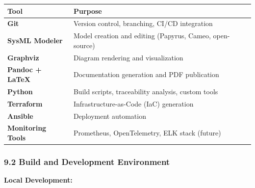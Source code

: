 \documentclass[12pt]{article}
\begin{document}
{\def\LTcaptype{none} %
\begin{longtable}[]{@{}
  >{\raggedright\arraybackslash}p{}
  >{\raggedright\arraybackslash}p{}@{}}
\toprule\noalign{}
\begin{minipage}[b]{\linewidth}\raggedright
Tool
\end{minipage} & \begin{minipage}[b]{\linewidth}\raggedright
Purpose
\end{minipage} \\
\midrule\noalign{}
\endhead
\bottomrule\noalign{}
\endlastfoot
\textbf{Git} & Version control, branching, CI/CD integration \\
\textbf{SysML Modeler} & Model creation and editing (Papyrus, Cameo,
open-source) \\
\textbf{Graphviz} & Diagram rendering and visualization \\
\textbf{Pandoc + LaTeX} & Documentation generation and PDF
publication \\
\textbf{Python} & Build scripts, traceability analysis, custom tools \\
\textbf{Terraform} & Infrastructure-as-Code (IaC) generation \\
\textbf{Ansible} & Deployment automation \\
\textbf{Monitoring Tools} & Prometheus, OpenTelemetry, ELK stack
(future) \\
\end{longtable}
}

\subsubsection{9.2 Build and Development
Environment}\label{build-and-development-environment}

\textbf{Local Development:}

\begin{Shaded}
\begin{Highlighting}[]
\end{Highlighting}
\end{Shaded}
\end{document}
